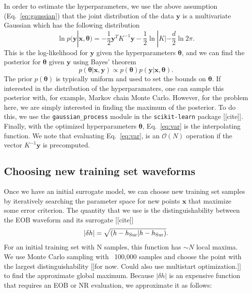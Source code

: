 \documentclass[prd,aps,letter,twocolumn,floatfix,notitlepage]{revtex4-1}
\begin{document}
In order to estimate the hyperparameters, we use the above assumption (Eq.~\eqref{eq:gaussian}) that the joint distribution of 
the data ${\bm y}$ is a multivariate Gaussian which has the following distribution
\begin{equation}
\ln p({\bm y} | {\bm x}, {\bm \theta}) = -\frac{1}{2}{\bm y}^T K^{-1} {\bm y} - \frac{1}{2} \ln |K| - \frac{d}{2} \ln 2\pi.
\end{equation}
This is the log-likelihood for ${\bm y}$ given the hyperparameters ${\bm \theta}$, and we can find the posterior for ${\bm \theta}$
given ${\bm y}$ using Bayes' theorem
\begin{equation}
p({\bm \theta} | {\bm x}, {\bm y}) \propto p({\bm \theta}) p({\bm y} | {\bm x}, {\bm \theta}).
\end{equation}
The prior $p({\bm \theta})$ is typically uniform and used to set the bounds on ${\bm \theta}$. If interested in the distribution of the 
hyperparamaters, one can sample this posterior with, for example, Markov chain Monte Carlo. However, for the problem here, we are
simply interested in finding the maximum of the posterior. To do this, we use the \texttt{gaussian\_process} module in the
\texttt{scikit-learn} package [[cite]]. Finally, with the optimized hyperparameters ${\bm \theta}$, Eq.~\eqref{eq:var} is the 
interpolating function. We note that evaluating Eq.~\eqref{eq:var}, is an $\mathcal{O}(N)$ operation if the vector $K^{-1}{\bm y}$ is
precomputed.




\subsection{Choosing new training set waveforms}

Once we have an initial surrogate model, we can choose new training set samples by iteratively searching the parameter space
for new points ${\bm x}$ that maximize some error criterion. The quantity that we use is the distinguishability between the
EOB waveform and its surrogate [[cite]]
\begin{equation}
|\delta h | = \sqrt{(h - h_{\rm Sur} | h - h_{\rm Sur})}.
\end{equation}
For an initial training set with N samples, this function has $\sim N$ local maxima. We use Monte Carlo sampling with ~100,000
samples and choose the point with the largest distinguishability [[for now. Could also use multistart optimization.]] to find the 
approximate global maximum. Because $|\delta h |$ is an expensive function that requires an EOB or NR evaluation, 
we approximate it as follows:
\end{document}
